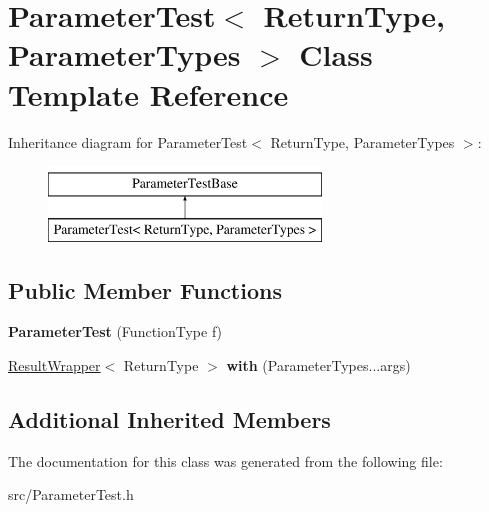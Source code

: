 \hypertarget{class_parameter_test}{\section{Parameter\-Test$<$ Return\-Type, Parameter\-Types $>$ Class Template Reference}
\label{class_parameter_test}
}
Inheritance diagram for Parameter\-Test$<$ Return\-Type, Parameter\-Types $>$\-:\begin{figure}[H]
\begin{center}
\leavevmode
\includegraphics[height=2.000000cm]{class_parameter_test}
\end{center}
\end{figure}
\subsection*{Public Member Functions}
\begin{DoxyCompactItemize}
\item 
\hypertarget{class_parameter_test_ad2e081c4df70f85ab04a5a327fcd1a7a}{{\bfseries Parameter\-Test} (Function\-Type f)}\label{class_parameter_test_ad2e081c4df70f85ab04a5a327fcd1a7a}

\item 
\hypertarget{class_parameter_test_aa67d93cda5bfc024a7d419d7d6d26b87}{\hyperlink{class_result_wrapper}{Result\-Wrapper}$<$ Return\-Type $>$ {\bfseries with} (Parameter\-Types...\-args)}\label{class_parameter_test_aa67d93cda5bfc024a7d419d7d6d26b87}

\end{DoxyCompactItemize}
\subsection*{Additional Inherited Members}


The documentation for this class was generated from the following file\-:\begin{DoxyCompactItemize}
\item 
src/Parameter\-Test.\-h\end{DoxyCompactItemize}
